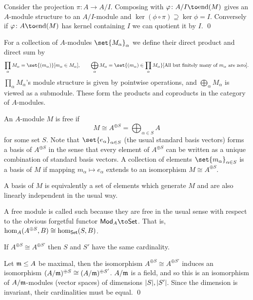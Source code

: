 \eprop

\bproof

    Consider the projection $\pi\colon A\to A/I$.
    Composing with $\phi\colon A/I\to\endo(M)$ gives an $A$-module structure to an $A/I$-module and $\ker(\phi\circ\pi)\supseteq\ker\phi=I$.
    Conversely if $\phi\colon A\to\endo(M)$ has kernel containing $I$ we can quotient it by $I$.
    \qed

\eproof

\bdefn

    For a collection of $A$-modules $\set{M_\alpha}_\alpha$ we define their {\emphcolor direct product} and {\emphcolor direct sum}
    by
    $$ \prod_\alpha M_\alpha = \set{(m_\alpha)}[m_\alpha\in M_\alpha],\qquad
    \bigoplus_\alpha M_\alpha = \set{(m_\alpha)\in\prod_\alpha M_\alpha}[\hbox{All but finitely many of $m_\alpha$ are zero}] . $$
    $\prod_\alpha M_\alpha$'s module structure is given by pointwise operations, and $\bigoplus_\alpha M_\alpha$ is viewed as a submodule.
    These form the products and coproducts in the category of $A$-modules.

\edefn

\bdefn

    An $A$-module $M$ is {\emphcolor free} if
    $$ M \cong A^{\oplus S} = \bigoplus_{\alpha\in S}A $$
    for some set $S$.
    Note that $\set{e_\alpha}_{\alpha\in S}$ (the usual standard basis vectors) forms a basis of $A^{\oplus S}$ in the sense that every
    element of $A^{\oplus S}$ can be written as a unique combination of standard basis vectors.
    A collection of elements $\set{m_\alpha}_{\alpha\in S}$ is a {\emphcolor basis} of $M$ if mapping $m_\alpha\mapsto e_\alpha$ extends
    to an isomorphism $M\cong A^{\oplus S}$.

\edefn

A basis of $M$ is equivalently a set of elements which generate $M$ and are also linearly independent in the usual way.

A free module is called such because they are free in the usual sense with respect to the obvious forgetful functor $\Mod_A\to\Set$.
That is, $\hom_A(A^{\oplus S},B)\cong\hom_{\sf Set}(S,B)$.

\bprop

    If $A^{\oplus S}\cong A^{\oplus S'}$ then $S$ and $S'$ have the same cardinality.

\eprop

\bproof

    Let ${{\frak m}}\leq A$ be maximal, then the isomorphism $A^{\oplus S}\cong A^{\oplus S'}$ induces an isomorphism
    $(A/{{\frak m}})^{\oplus S}\cong(A/{{\frak m}})^{\oplus S'}$.
    $A/{{\frak m}}$ is a field, and so this is an isomorphism of $A/{{\frak m}}$-modules (vector spaces) of dimensions $\mathopen{}\mathclose{\left|S\right|},\mathopen{}\mathclose{\left|S'\right|}$.
    Since the dimension is invariant, their cardinalities must be equal.
    \qed

